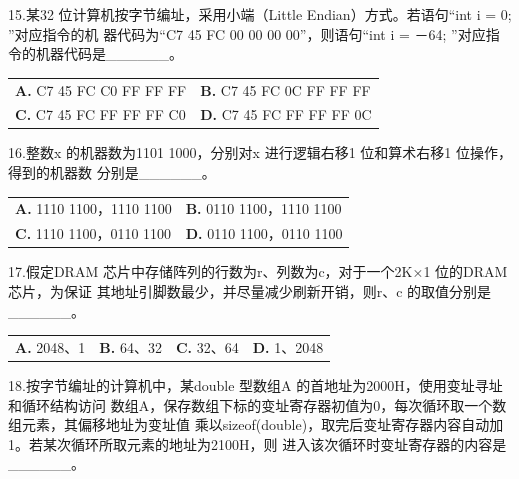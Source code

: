\documentclass[UTF8,11pt]{ctexart}
\begin{document}
15.某32 位计算机按字节编址，采用小端（Little Endian）方式。若语句“int i = 0; ”对应指令的机 器代码为“C7 45 FC 00 00 00 00”，则语句“int i = －64; ”对应指令的机器代码是\_\_\_\_\_\_。


\begin{center}\begin{tabular}{>{\raggedright\arraybackslash}p{\dimexpr(\linewidth-4\tabcolsep)/2\relax}>{\raggedright\arraybackslash}p{\dimexpr(\linewidth-4\tabcolsep)/2\relax}}
\textbf{A.} C7 45 FC C0 FF FF FF & \textbf{B.} C7 45 FC 0C FF FF FF\\[.35em]
\textbf{C.} C7 45 FC FF FF FF C0 & \textbf{D.} C7 45 FC FF FF FF 0C\\[.35em]\end{tabular}\end{center}

16.整数x 的机器数为1101 1000，分别对x 进行逻辑右移1 位和算术右移1 位操作，得到的机器数 分别是\_\_\_\_\_\_。


\begin{center}\begin{tabular}{>{\raggedright\arraybackslash}p{\dimexpr(\linewidth-4\tabcolsep)/2\relax}>{\raggedright\arraybackslash}p{\dimexpr(\linewidth-4\tabcolsep)/2\relax}}
\textbf{A.} 1110 1100，1110 1100 & \textbf{B.} 0110 1100，1110 1100\\[.35em]
\textbf{C.} 1110 1100，0110 1100 & \textbf{D.} 0110 1100，0110 1100\\[.35em]\end{tabular}\end{center}

17.假定DRAM 芯片中存储阵列的行数为r、列数为c，对于一个2K×1 位的DRAM 芯片，为保证 其地址引脚数最少，并尽量减少刷新开销，则r、c 的取值分别是\_\_\_\_\_\_。


\begin{center}\begin{tabular}{>{\raggedright\arraybackslash}p{\dimexpr(\linewidth-8\tabcolsep)/4\relax}>{\raggedright\arraybackslash}p{\dimexpr(\linewidth-8\tabcolsep)/4\relax}>{\raggedright\arraybackslash}p{\dimexpr(\linewidth-8\tabcolsep)/4\relax}>{\raggedright\arraybackslash}p{\dimexpr(\linewidth-8\tabcolsep)/4\relax}}
\textbf{A.} 2048、1 & \textbf{B.} 64、32 & \textbf{C.} 32、64 & \textbf{D.} 1、2048\\[.35em]\end{tabular}\end{center}

18.按字节编址的计算机中，某double 型数组A 的首地址为2000H，使用变址寻址和循环结构访问 数组A，保存数组下标的变址寄存器初值为0，每次循环取一个数组元素，其偏移地址为变址值 乘以sizeof(double)，取完后变址寄存器内容自动加1。若某次循环所取元素的地址为2100H，则 进入该次循环时变址寄存器的内容是\_\_\_\_\_\_。
\end{document}
